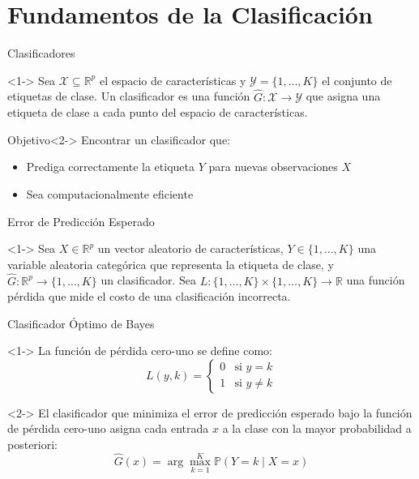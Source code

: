 \documentclass[spanish,handout]{beamer}
\begin{document}
\section{Fundamentos de la Clasificación}

\begin{frame}{Clasificadores}
\begin{definition}[Clasificador]<1->
Sea $\mathcal{X} \subseteq \mathbb{R}^p$ el espacio de características y $\mathcal{Y} = \{1,\ldots,K\}$ el conjunto de etiquetas de clase. Un clasificador es una función $\hat{G}: \mathcal{X} \to \mathcal{Y}$ que asigna una etiqueta de clase a cada punto del espacio de características.
\end{definition}

\begin{block}{Objetivo}<2->
Encontrar un clasificador que:
\begin{itemize}[<+->]
    \item Prediga correctamente la etiqueta $Y$ para nuevas observaciones $X$
    \item Sea computacionalmente eficiente
\end{itemize}
\end{block}
\end{frame}

\begin{frame}{Error de Predicción Esperado}
\begin{definition}<1->
Sea $X \in \mathbb{R}^p$ un vector aleatorio de características, $Y \in \{1,\ldots,K\}$ una variable aleatoria categórica que representa la etiqueta de clase, y $\hat{G}: \mathbb{R}^p \to \{1,\ldots,K\}$ un clasificador. Sea $L: \{1,\ldots,K\} \times \{1,\ldots,K\} \to \mathbb{R}$ una función pérdida que mide el costo de una clasificación incorrecta.
\end{definition}

\end{frame}

\begin{frame}{Clasificador Óptimo de Bayes}
\begin{definition}<1->
La función de pérdida cero-uno se define como:
\[
L(y, k) = \begin{cases}
0 & \text{si } y = k \\
1 & \text{si } y \neq k
\end{cases}
\]
\end{definition}

\begin{theorem}<2->
El clasificador que minimiza el error de predicción esperado bajo la función de pérdida cero-uno asigna cada entrada $x$ a la clase con la mayor probabilidad a posteriori:
\[
\hat{G}(x) = \arg\max_{k=1}^K \mathbb{P}(Y = k \mid X = x)
\]
\end{theorem}
\end{frame}
\end{document}
